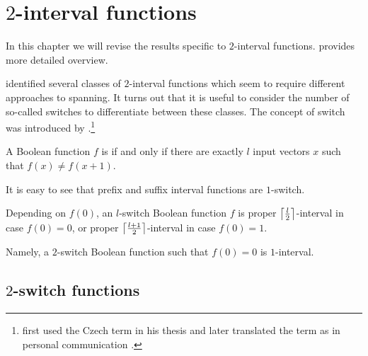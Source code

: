 \chapter{\texorpdfstring{$2$}{2}-interval functions}
\label{chap:2interval}

In this chapter we will revise the results specific to
$2$-interval functions.
\citet{Dubovsky2012}
provides more detailed overview.

\citeauthor{Dubovsky2012} identified several classes
of $2$-interval functions \citep[p.~5]{Dubovsky2012}
which seem to require different approaches to spanning.
It turns out that it is useful to consider
the number of so-called switches
to differentiate between these classes.
The concept of switch was introduced by
\citet{Husek2014,Husek2015}.\footnote{
\citeauthor{Husek2014} first used the Czech term
in his thesis \citep[p.~13]{Husek2014}
and later translated the term as 
in personal communication \citep{Husek2015}.
}

\begin{definition}
A Boolean function $f$ is 
if and only if
there are exactly $l$ input vectors $x$ such that
$f(x) \neq f(x+1)$.
\end{definition}

It is easy to see that
prefix and suffix interval functions are $1$-switch.

Depending on $f(0)$,
an $l$-switch Boolean function $f$
is proper $\ceil*{\frac{l}{2}}$-interval
in case $f(0) = 0$,
or proper $\ceil*{\frac{l+1}{2}}$-interval
in case $f(0) = 1$.

Namely,
a $2$-switch Boolean function such that $f(0) = 0$
is $1$-interval.

\section{\texorpdfstring{$2$}{2}-switch functions}
\label{sec:2int2switch}

